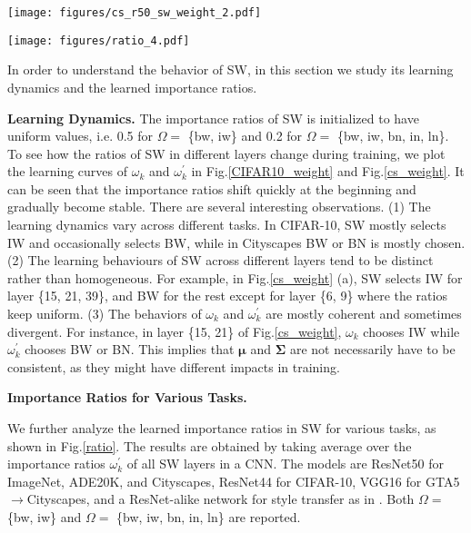 \documentclass[10pt,twocolumn,letterpaper]{article}
\begin{document}
\begin{figure*}[t!]
	\centering
	\texttt{[image: figures/cs\_r50\_sw\_weight\_2.pdf]}
	\caption{Learning curve of importance weights in ResNet50 on Cityscapes. (a)(b)(c)(d) have the same meanings as in Fig.\ref{CIFAR10_weight}.}
	\label{cs_weight}
\end{figure*}

\begin{figure*}[t!]
	\centering
	\texttt{[image: figures/ratio\_4.pdf]}
	\caption{Learned importance ratios of SW in various tasks. Above and below correspond to \(\Omega = \) \{bw, iw\} and \(\Omega = \) \{bw, iw, bn, in, ln\} respectively.}
	\label{ratio}
	\vspace{-8pt}
\end{figure*}

In order to understand the behavior of SW, in this section we study its learning dynamics and the learned importance ratios.

\noindent\textbf{Learning Dynamics.}
The importance ratios of SW is initialized to have uniform values, i.e. 0.5 for \(\Omega = \) \{bw, iw\} and 0.2 for \(\Omega = \) \{bw, iw, bn, in, ln\}.
To see how the ratios of SW in different layers change during training, we plot the learning curves of \(\omega_k\) and \(\omega_{k}^{\prime}\) in Fig.\ref{CIFAR10_weight} and Fig.\ref{cs_weight}. It can be seen that the importance ratios shift quickly at the beginning and gradually become stable.
There are several interesting observations.
(1) The learning dynamics vary across different tasks.
In CIFAR-10, SW mostly selects IW and occasionally selects BW, while in Cityscapes BW or BN is mostly chosen.
(2) The learning behaviours of SW across different layers tend to be distinct rather than homogeneous.
For example, in Fig.\ref{cs_weight} (a), SW selects IW for layer \{15, 21, 39\}, and BW for the rest except for layer \{6, 9\} where the ratios keep uniform.
(3) The behaviors of \(\omega_k\) and \(\omega_{k}^{\prime}\) are mostly coherent and sometimes divergent.
For instance, in layer \{15, 21\} of Fig.\ref{cs_weight}, \(\omega_k\) chooses IW while \(\omega_{k}^{\prime}\) chooses BW or BN.
This implies that \(\bm{\mu}\) and \(\bm{\Sigma}\) are not necessarily have to be consistent, as they might have different impacts in training.


\noindent\textbf{Importance Ratios for Various Tasks.}

We further analyze the learned importance ratios in SW for various tasks, as shown in Fig.\ref{ratio}.
The results are obtained by taking average over the importance ratios \(\omega_{k}^{\prime}\) of all SW layers in a CNN.
The models are ResNet50 for ImageNet, ADE20K, and Cityscapes, ResNet44 for CIFAR-10, VGG16 for GTA5$\rightarrow$Cityscapes, and a ResNet-alike network for style transfer as in \cite{johnson2016perceptual}.
Both \(\Omega = \) \{bw, iw\} and \(\Omega = \) \{bw, iw, bn, in, ln\} are reported.
\end{document}
